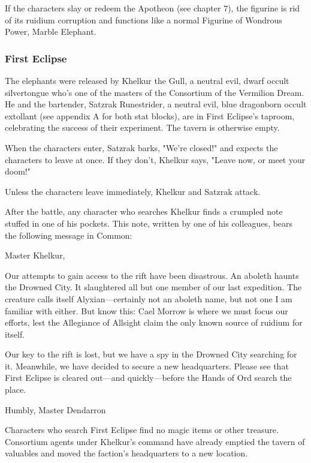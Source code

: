 \documentclass[10pt,a4paper,twoside,bg=print,twocolumn,openany,nodeprecatedcode]{dndbook}
\begin{document}
If the characters slay or redeem the Apotheon (see chapter 7), the figurine is rid of its ruidium corruption and functions like a normal Figurine of Wondrous Power, Marble Elephant.

\subsubsection{First Eclipse}
The elephants were released by Khelkur the Gull, a neutral evil, dwarf occult silvertongue who's one of the masters of the Consortium of the Vermilion Dream. He and the bartender, Satzrak Runestrider, a neutral evil, blue dragonborn occult extollant (see appendix A for both stat blocks), are in First Eclipse's taproom, celebrating the success of their experiment. The tavern is otherwise empty.

When the characters enter, Satzrak barks, "We're closed!" and expects the characters to leave at once. If they don't, Khelkur says, "Leave now, or meet your doom!"

Unless the characters leave immediately, Khelkur and Satzrak attack.

After the battle, any character who searches Khelkur finds a crumpled note stuffed in one of his pockets. This note, written by one of his colleagues, bears the following message in Common:

\begin{DndReadAloud}{}
Master Khelkur,

Our attempts to gain access to the rift have been disastrous. An aboleth haunts the Drowned City. It slaughtered all but one member of our last expedition. The creature calls itself Alyxian—certainly not an aboleth name, but not one I am familiar with either. But know this: Cael Morrow is where we must focus our efforts, lest the Allegiance of Allsight claim the only known source of ruidium for itself.

Our key to the rift is lost, but we have a spy in the Drowned City searching for it. Meanwhile, we have decided to secure a new headquarters. Please see that First Eclipse is cleared out—and quickly—before the Hands of Ord search the place.

Humbly, Master Dendarron

\end{DndReadAloud}

Characters who search First Eclipse find no magic items or other treasure. Consortium agents under Khelkur's command have already emptied the tavern of valuables and moved the faction's headquarters to a new location.
\end{document}
